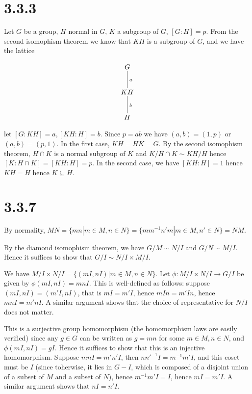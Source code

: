 \documentclass{article}
\def\inv{{-1}}
\begin{document}
\section*{3.3.3}

Let $G$ be a group, $H$ normal in $G$, $K$ a subgroup of $G$, $[G:H] = p$. From the second isomophism theorem we know that $KH$ is a subgroup of $G$, and we have the lattice 

$$
\xymatrix{
G \ar@{-}[d]^{a} \\
KH \ar@{-}[d]^{b} \\
H
}
$$

let $[G:KH] = a, [KH:H] = b$. Since $p = ab$ we have $(a, b) = (1, p)$ or $(a, b) = (p, 1)$. In the first case, $KH = HK = G$. By the second isomophism theorem, $H \cap K$ is a normal subgroup of $K$ and $K / H \cap K \sim KH / H$ hence $[K : H \cap K] = [KH : H] = p$. In the second case, we have $[KH : H] = 1$ hence $KH = H$ hence $K \subseteq H$.

\section*{3.3.7}

By normality, $MN = \{ mn | m \in M, n \in N\} = \{ m m^\inv n' m | m \in M, n' \in N \} = NM$.


By the diamond isomophism theorem, we have $G / M \sim N / I$ and $G / N \sim M / I$. Hence it suffices to show that $G / I \sim N / I \times M / I$.

We have $M / I \times N / I = \{(mI, nI) | m \in M, n \in N\}$. Let $\phi: M/I \times N/I \to G/I$ be given by $\phi(mI, nI) = mnI$. This is well-defined as follows: suppose $(mI, nI) = (m'I, nI)$, that is $mI = m'I$, hence $mIn = m'In$, hence $mnI = m'nI$. A similar argument shows that the choice of representative for $N/I$ does not matter.

This is a surjective group homomorphism (the homomorphism laws are easily verified) since any $g \in G$ can be written as $g = mn$ for some $m \in M, n \in N$, and $\phi(mI, nI) = gI$. Hence it suffices to show that this is an injective homomorphism. Suppose $mnI = m'n'I$, then $n n'^\inv I = m^\inv m' I$, and this coset must be $I$ (since toherwise, it lies in $G - I$, which is composed of a disjoint union of a subset of $M$ and a subset of $N$), hence $m^\inv m' I = I$, hence $mI = m'I$. A similar argument shows that $nI = n'I$.
\end{document}

